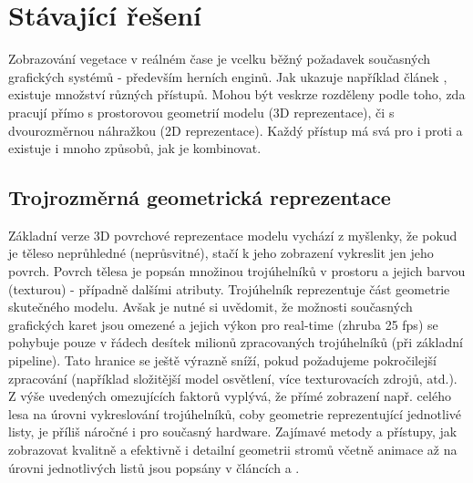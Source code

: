 \section{Stávající řešení}
\label{sec:solutions}

Zobrazování vegetace v reálném čase je vcelku běžný požadavek současných grafických systémů - především herních enginů. Jak ukazuje například článek \cite{Mantler_2003_SARRV}, existuje množství různých přístupů. Mohou být veskrze rozděleny podle toho, zda pracují přímo s prostorovou geometrií modelu (3D reprezentace), či s dvourozměrnou náhražkou (2D reprezentace). Každý přístup má svá pro i proti a existuje i mnoho způsobů, jak je kombinovat.
 
\subsection{Trojrozměrná geometrická reprezentace}
Základní verze 3D povrchové reprezentace modelu vychází z myšlenky, že pokud je těleso neprůhledné (neprůsvitné), stačí k jeho zobrazení vykreslit jen jeho povrch. Povrch tělesa je popsán množinou trojúhelníků v prostoru a jejich barvou (texturou) - případně dalšími atributy. Trojúhelník reprezentuje část geometrie skutečného modelu. Avšak je nutné si uvědomit, že možnosti současných grafických karet jsou omezené a jejich výkon pro real-time (zhruba 25 fps) se pohybuje pouze v řádech desítek milionů zpracovaných trojúhelníků  (při základní pipeline). Tato hranice se ještě výrazně sníží, pokud požadujeme pokročilejší zpracování (například složitější model osvětlení, více texturovacích zdrojů, atd.). Z výše uvedených omezujících faktorů vyplývá, že přímé zobrazení např. celého lesa na úrovni vykreslování trojúhelníků, coby geometrie reprezentující jednotlivé listy, je příliš náročné i pro současný hardware.
Zajímavé metody a přístupy, jak zobrazovat kvalitně a efektivně i detailní geometrii stromů včetně animace až na úrovni jednotlivých listů jsou popsány v článcích \cite{Habel_09_PGT} a \cite{Habel_2007_RTT}. 
